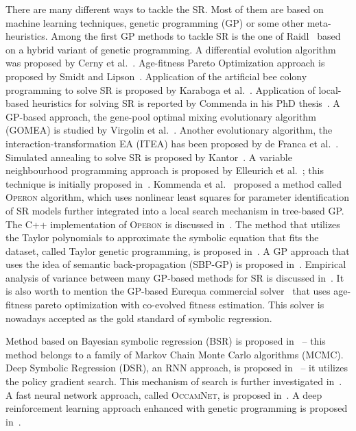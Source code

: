 \documentclass{bmcart}
\begin{document}
	There are many different ways to tackle the SR. Most of them are based on   machine learning techniques, genetic programming (GP) or some other meta-heuristics. Among the first GP methods to tackle SR is the one of Raidl~\cite{raidl1998hybrid} based on a hybrid variant of genetic programming. A differential evolution algorithm was proposed by Cerny et al.~\cite{cerny2008using}. Age-fitness Pareto Optimization approach is proposed by Smidt and Lipson~\cite{schmidt2010age}.  Application of the artificial bee colony programming to solve SR is proposed by Karaboga et al.~\cite{karaboga2012artificial}. 
Application of local-based heuristics for solving SR is reported by Commenda in his PhD thesis~\cite{kommenda2018local}. A GP-based approach, the gene-pool optimal mixing evolutionary algorithm (\textsc{GOMEA}) is studied by Virgolin et al.~\cite{virgolin2021improving}.  Another evolutionary algorithm, the interaction-transformation EA (\textsc{ITEA}) has been proposed by de Franca et al.~\cite{de2021interaction}. Simulated annealing to solve SR is proposed by Kantor~\cite{kantor2021simulated}. A variable neighbourhood programming approach  is proposed by Elleurich et al.~\cite{elleuch2020variable}; this technique is initially proposed in~\cite{elleuch2016variable}. 
Kommenda et al.~\cite{kommenda2020parameter} proposed a method called \textsc{Operon} algorithm, which uses nonlinear least squares for parameter identification of SR models further integrated into a local search mechanism in tree-based GP. The C++ implementation of \textsc{Operon} is discussed in~\cite{burlacu2020operon}. The method that utilizes the Taylor polynomials to approximate the symbolic equation that fits the dataset, called Taylor genetic programming, is proposed in~\cite{he2022taylor}. A GP approach that uses the idea of semantic back-propagation (SBP-GP) is proposed in~\cite{virgolin2019linear}.  Empirical analysis of variance between many GP-based methods for SR is discussed in~\cite{kammerer2021empirical}. It is also worth to mention the GP-based Eurequa commercial solver~\cite{schmidt2009distilling, schmidt2011machine} that uses age-fitness pareto optimization with co-evolved fitness estimation. This solver is nowadays accepted as the gold standard of symbolic regression.   

	Method based on Bayesian symbolic regression (\textsc{BSR}) is proposed in~\cite{jin2019bayesian} -- this method belongs to a family of Markov Chain Monte Carlo algorithms (MCMC). Deep Symbolic Regression (\textsc{DSR}), an RNN approach, is proposed in~\cite{petersen2019deep} -- it utilizes the policy gradient search. This mechanism of search is further investigated in~\cite{landajuela2021improving}. A fast neural network approach, called \textsc{OccamNet},  is proposed in~\cite{costa2020fast}.  A deep reinforcement learning approach enhanced with genetic programming is proposed in~\cite{mundhenk2021symbolic}. 
\end{document}
